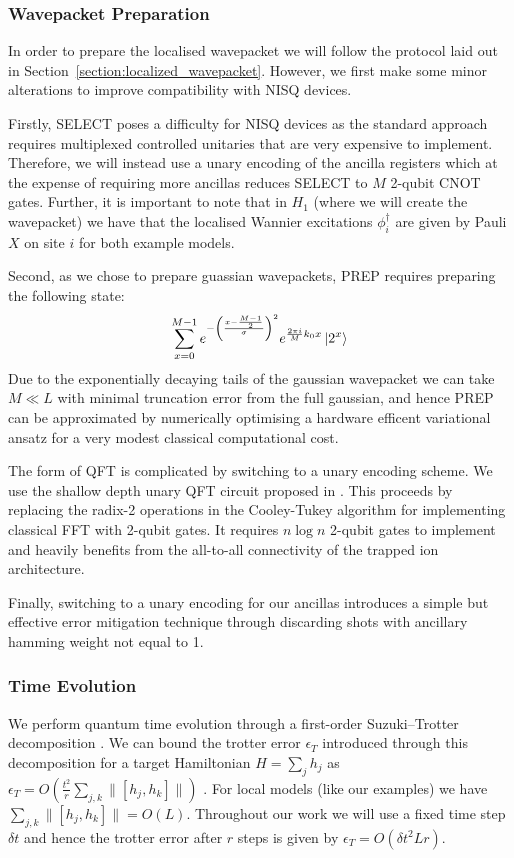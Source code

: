 \documentclass[aps,floatfix,10pt,amssymb,amsfont,amsmath,superscriptaddress,float,nofootinbib,longbibliography,nobalancelastpage,twocolumn,prx]{revtex4-2}
\begin{document}
\subsubsection{Wavepacket Preparation}
In order to prepare the localised wavepacket we will follow the protocol laid out in Section~\ref{section:localized_wavepacket}. However, we first make some minor alterations to improve compatibility with NISQ devices. 

Firstly, \textsc{SELECT} poses a difficulty for NISQ devices as the standard approach requires multiplexed controlled unitaries that are very expensive to implement. Therefore, we will instead use a unary encoding of the ancilla registers which at the expense of requiring more ancillas reduces SELECT to $M$ 2-qubit \textsc{CNOT} gates. Further, it is important to note that in $H_1$ (where we will create the wavepacket) we have that the localised Wannier excitations $\phi_i^{\dagger}$ are given by Pauli $X$ on site $i$ for both example models.

Second, as we chose to prepare guassian wavepackets, \textsc{PREP} requires preparing the following state:
\begin{equation}
    \sum_{x=0}^{M-1}e^{-\left(\frac{x-\frac{M-1}{2}}{\sigma}\right)^2}e^{\frac{2\pi i}{M}k_0 x} \ket{2^x}
\end{equation}
Due to the exponentially decaying tails of the gaussian wavepacket we can take $M \ll L$ with minimal truncation error from the full gaussian, and hence \textsc{PREP} can be approximated by numerically optimising a hardware efficent variational ansatz for a very modest classical computational cost.

The form of \textsc{QFT} is complicated by switching to a unary encoding scheme. We use the shallow depth unary QFT circuit proposed in \cite{jain2024quantum}. This proceeds by replacing the radix-2 operations in the Cooley-Tukey algorithm \cite{cooleytukey} for implementing classical FFT with 2-qubit gates. It requires $n \log n$ 2-qubit gates to implement and heavily benefits from the all-to-all connectivity of the trapped ion architecture. 

Finally, switching to a unary encoding for our ancillas introduces a simple but effective error mitigation technique through discarding shots with ancillary hamming weight not equal to 1. 

\subsubsection{Time Evolution}
We perform quantum time evolution through a first-order Suzuki--Trotter decomposition \cite{}. We can bound the trotter error $\epsilon_T$ introduced through this decomposition for a target Hamiltonian $H = \sum_j h_j$ as $\epsilon_T = O\left(\frac{t^2}{r} \sum_{j,k} \|[h_j, h_k]\|\right)$ \cite{childs2019theory}. For local models (like our examples) we have $\sum_{j,k} \|[h_j, h_k]\| = O(L)$. Throughout our work we will use a fixed time step $\delta t$ and hence the trotter error after $r$ steps is given by $\epsilon_T=O\left( \delta t^2Lr\right)$.
\end{document}
